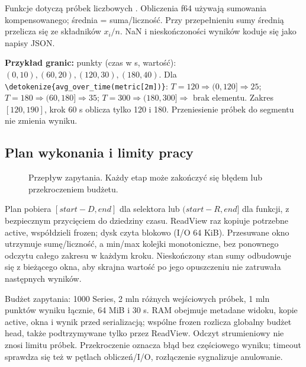 \documentclass[11pt,a4paper]{article}
\newcommand{\code}[1]{\expandafter\nolinkurl\expandafter{\detokenize{#1}}}
\begin{document}
Funkcje dotyczą próbek liczbowych \cite{prom-functions}.
Obliczenia f64 używają sumowania kompensowanego; średnia = suma/liczność.
Przy przepełnieniu sumy średnią przelicza się ze składników $x_i/n$.
NaN i nieskończoności wyników koduje się jako napisy JSON.

\textbf{Przykład granic:} punkty (czas w s, wartość):
$(0,10),(60,20),(120,30),(180,40)$.
Dla \code{avg_over_time(metric[2m])}:
$T=120\Rightarrow(0,120]\Rightarrow25$;
$T=180\Rightarrow(60,180]\Rightarrow35$;
$T=300\Rightarrow(180,300]\Rightarrow$ brak elementu.
Zakres $[120,190]$, krok 60 s oblicza tylko 120 i 180.
Przeniesienie próbek do segmentu nie zmienia wyniku.

\subsection{Plan wykonania i limity pracy}
\begin{figure}[htbp]
\centering
{}
\caption{Przepływ zapytania. Każdy etap może zakończyć się błędem lub przekroczeniem budżetu.}
\end{figure}

Plan pobiera $[start-D,end]$ dla selektora lub $(start-R,end]$ dla funkcji,
z bezpiecznym przycięciem do dziedziny czasu. ReadView raz kopiuje
potrzebne active, współdzieli frozen; dysk czyta blokowo (I/O 64 KiB).
Przesuwane okno utrzymuje sumę/liczność, a min/max kolejki monotoniczne,
bez ponownego odczytu całego zakresu w każdym kroku.
Nieskończony stan sumy odbudowuje się z bieżącego okna, aby skrajna
wartość po jego opuszczeniu nie zatruwała następnych wyników.

Budżet zapytania: 1000 Series, 2 mln różnych wejściowych próbek,
1 mln punktów wyniku łącznie, 64 MiB i 30 s. RAM obejmuje metadane widoku,
kopie active, okna i wynik przed serializacją; wspólne frozen rozlicza
globalny budżet head, także podtrzymywane tylko przez ReadView.
Odczyt strumieniowy nie znosi limitu próbek.
Przekroczenie oznacza błąd bez częściowego wyniku; timeout sprawdza się
też w pętlach obliczeń/I/O, rozłączenie sygnalizuje anulowanie.
\end{document}
